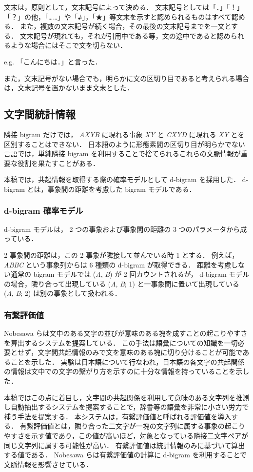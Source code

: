 文末は，原則として，文末記号によって決める．
文末記号としては「．」「！」「？」の他，「……」や「♪」，「★」等文末を示すと認められるものはすべて認める．
また，複数の文末記号が続く場合，その最後の文末記号までを一文とする．
文末記号が現れても，それが引用中である等，文の途中であると認められるような場合にはそこで文を切らない．

e.g. 「こんにちは．」と言った．

また，文末記号がない場合でも，明らかに文の区切り目であると考えられる場合は，文末記号を置かないまま文末とした．
\subsection{文字間統計情報}
\label{sec:scoring}
隣接 bigram だけでは， {\it AXYB} に現れる事象 {\it XY} と {\it CXYD} に現れる {\it XY} とを区別することはできない．
日本語のように形態素間の区切り目が明らかでない言語では，単純隣接 bigram を利用することで捨てられるこれらの文脈情報が重要な役割を果たすことがある．

本稿では，共起情報を取得する際の確率モデルとして d-bigram を採用した．
d-bigram とは，事象間の距離を考慮した bigram モデルである\cite{tsutsumi93}．
\subsubsection{d-bigram 確率モデル}
\label{sec:d-bigram}
d-bigram モデルは， 2 つの事象および事象間の距離の 3 つのパラメータから成っている．

2 事象間の距離は，この 2 事象が隣接して並んでいる時 1 とする．
例えば， {\it ABBC} という事象列からは 6 種類の d-bigram が取得できる． 
距離を考慮しない通常の bigram モデルでは ({\it A}, {\it B}) が 2 回カウントされるが， d-bigram モデルの場合，隣り合って出現している ({\it A}, {\it B}; 1) と一事象間に置いて出現している ({\it A}, {\it B}; 2) は別の事象として扱われる．
\subsubsection{有繋評価値}
\label{sec:linkyscore}
Nobesawa らは文中のある文字の並びが意味のある塊を成すことの起こりやすさを算出するシステムを提案している\cite{nobesawa96coling}．
この手法は語彙についての知識を一切必要とせず，文字間共起情報のみで文を意味のある塊に切り分けることが可能であることを示した．
実験は日本語について行なわれ，日本語の各文字の共起関係の情報は文中での文字の繋がり方を示すのに十分な情報を持っていることを示した．

本稿ではこの点に着目し，文字間の共起関係を利用して意味のある文字列を推測し自動抽出するシステムを提案することで，辞書等の語彙を非常に小さい労力で補う手法を提案する．
本システムは，有繋評価値と呼ばれる評価値\cite{nobesawa96coling}を導入する．
有繋評価値とは，隣り合った二文字が一塊の文字列に属する事象の起こりやすさを示す値であり，この値が高いほど，対象となっている隣接二文字ペアが同じ文字列に属する可能性が高い．
有繋評価値は統計情報のみに基づいて算出する値である．
Nobesawa らは有繋評価値の計算に d-bigram を利用することで文脈情報を影響させている．

